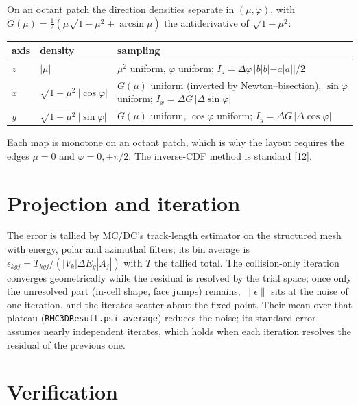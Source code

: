\documentclass[11pt]{article}
\newcommand{\teps}{\tilde\epsilon}
\begin{document}
On an octant patch the direction densities separate in $(\mu,\varphi)$, with
$G(\mu)=\tfrac12(\mu\sqrt{1-\mu^2}+\arcsin\mu)$ the antiderivative of
$\sqrt{1-\mu^2}$:
\begin{center}
\begin{tabular}{lll}
\toprule
axis & density & sampling \\
\midrule
$z$ & $|\mu|$ & $\mu^2$ uniform, $\varphi$ uniform;
$I_z = \Delta\varphi\,|b|b|-a|a||/2$ \\
$x$ & $\sqrt{1-\mu^2}\,|\cos\varphi|$ & $G(\mu)$ uniform (inverted by
Newton--bisection), $\sin\varphi$ uniform; $I_x = \Delta G\,|\Delta\sin\varphi|$ \\
$y$ & $\sqrt{1-\mu^2}\,|\sin\varphi|$ & $G(\mu)$ uniform, $\cos\varphi$ uniform;
$I_y = \Delta G\,|\Delta\cos\varphi|$ \\
\bottomrule
\end{tabular}
\end{center}
Each map is monotone on an octant patch, which is why the layout requires the edges
$\mu=0$ and $\varphi=0,\pm\pi/2$. The inverse-CDF method is standard [12].

\section{Projection and iteration}

The error is tallied by MC/DC's track-length estimator on the structured mesh with
energy, polar and azimuthal filters; its bin average is
$\teps_{kgj} = T_{kgj}/(|V_k|\Delta E_g|A_j|)$ with $T$ the tallied total. The
collision-only iteration converges geometrically while the residual is resolved by
the trial space; once only the unresolved part (in-cell shape, face jumps) remains,
$\|\teps\|$ sits at the noise of one iteration, and the iterates scatter about the
fixed point. Their mean over that plateau (\texttt{RMC3DResult.psi\_average})
reduces the noise; its standard error assumes nearly independent iterates, which
holds when each iteration resolves the residual of the previous one.

\section{Verification}
\end{document}
